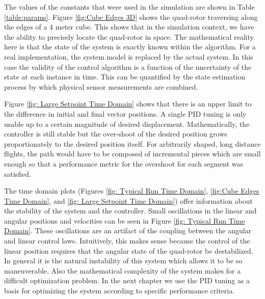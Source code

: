 The values of the constants that were used in the simulation are shown in Table \ref{table:params}. Figure \ref{fig:Cube Edges 3D} shows the quad-rotor traversing along the edges of a 4 meter cube. This shows that in the simulation context, we have the ability to precisely locate the quad-rotor in space. The mathematical reality here is that the state of the system is exactly known within the algorithm. For a real implementation, the system model is replaced by the actual system. In this case the validity of the control algorithm is a function of the uncertainty of the state at each instance in time. This can be quantified by the state estimation process by which physical sensor measurements are combined.

Figure \ref{fig: Large Setpoint Time Domain} shows that there is an upper limit to the difference in initial and final vector positions. A single PID tuning is only usable up to a certain magnitude of desired displacement. Mathematically, the controller is still stable but the over-shoot of the desired position grows proportionately to the desired position itself. For arbitrarily shaped, long distance flights, the path would have to be composed of incremental pieces which are small enough so that a performance metric for the overshoot for each segment was satisfied.

The time domain plots (Figures     \ref{fig: Typical Run Time Domain},   \ref{fig:Cube Edges Time Domain}, and \ref{fig: Large Setpoint Time Domain}) offer information about the stability of the system and the controller. Small oscillations in the linear and angular positions and velocities can be seen in Figure \ref{fig: Typical Run Time Domain}. These oscillations are an artifact of the coupling between the angular and linear control laws. Intuitively, this makes sense because the control of the linear position requires that the angular state of the quad-rotor be destabilized. In general it is the natural instability of this system which allows it to be so maneuverable. Also the mathematical complexity of the system makes for a difficult optimization problem. In the next chapter we use the PID tuning as a basis for optimizing the system according to specific performance criteria.

